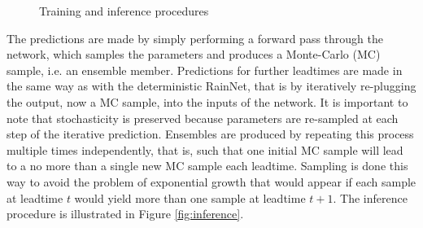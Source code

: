 \begin{figure}[ht]
	\begin{center}
	
	
		\caption{Training and inference procedures}
		\label{fig:training_inference_diagram}
	\end{center}
\end{figure}

The predictions are made by simply performing a forward pass through the network, which samples the parameters and produces a Monte-Carlo (MC) sample, i.e. an ensemble member. Predictions for further leadtimes are made in the same way as with the deterministic RainNet, that is by iteratively re-plugging the output, now a MC sample, into the inputs of the network. It is important to note that stochasticity is preserved because parameters are re-sampled at each step of the iterative prediction. Ensembles are produced by repeating this process multiple times independently, that is, such that one initial MC sample will lead to a no more than a single new MC sample each leadtime. Sampling is done this way to avoid the problem of exponential growth that would appear if each sample at leadtime $t$ would yield more than one sample at leadtime $t+1$. The inference procedure is illustrated in Figure \ref{fig:inference}.

